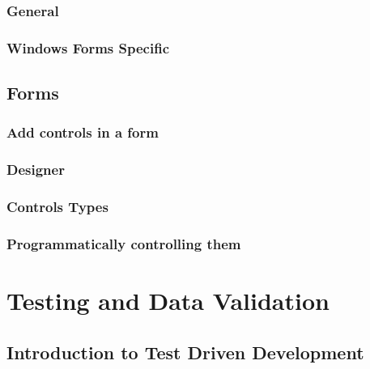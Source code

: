 \documentclass[
]{book}
\begin{document}
\hypertarget{general}{%
\subsection{General}\label{general}}

\hypertarget{windows-forms-specific}{%
\subsection{Windows Forms Specific}\label{windows-forms-specific}}

\hypertarget{forms}{%
\section{Forms}\label{forms}}

\hypertarget{add-controls-in-a-form}{%
\subsection{Add controls in a form}\label{add-controls-in-a-form}}

\hypertarget{designer}{%
\subsection{Designer}\label{designer}}

\hypertarget{controls-types}{%
\subsection{Controls Types}\label{controls-types}}

\hypertarget{programmatically-controlling-them}{%
\subsection{Programmatically controlling them}\label{programmatically-controlling-them}}

\hypertarget{testing-and-data-validation}{%
\chapter{Testing and Data Validation}\label{testing-and-data-validation}}

\hypertarget{introduction-to-test-driven-development}{%
\section{Introduction to Test Driven Development}\label{introduction-to-test-driven-development}}
\end{document}
